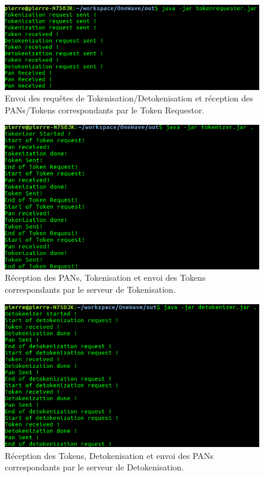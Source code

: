 \documentclass{report}
\begin{document}
\begin{figure}[!ht]
    \centering
			\includegraphics[scale=0.47]{img/client_tokenRequestor.png}
			\caption{\label{Trello} Envoi des requêtes de Tokenisation/Detokenisation et réception des PANs/Tokens correspondants par le Token Requestor.}			
\end{figure}

\begin{figure}[!ht]
    \centering
			\includegraphics[scale=0.47]{img/serveur_tokenizer.png}
			\caption{\label{Trello} Réception des PANs, Tokenisation et envoi des Tokens correspondants par le serveur de Tokenisation.}			
\end{figure}

\begin{figure}[!ht]
    \centering
			\includegraphics[scale=0.47]{img/serveur_detokenizer.png}
			\caption{\label{Trello} Réception des Tokens, Detokenisation et envoi des PANs correspondants par le serveur de Detokenisation.}			
\end{figure}
\end{document}
